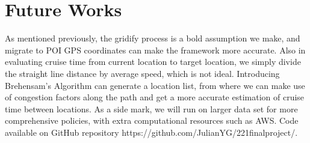 \documentclass[letterpaper, 10 pt, conference]{ieeeconf}
\begin{document}
\section{Future Works}
As mentioned previously, the gridify process is a bold assumption we make, and migrate to POI GPS coordinates can make the framework more accurate. Also in evaluating cruise time from current location to target location, we simply divide the straight line distance by average speed, which is not ideal. Introducing Brehensam's Algorithm can generate a location list, from where we can make use of congestion factors along the path and get a more accurate estimation of cruise time between locations. As a side mark, we will run on larger data set for more comprehensive policies, with extra computational resources such as AWS. Code available on GitHub repository https://github.com/JulianYG/221finalproject/.


\end{document}
